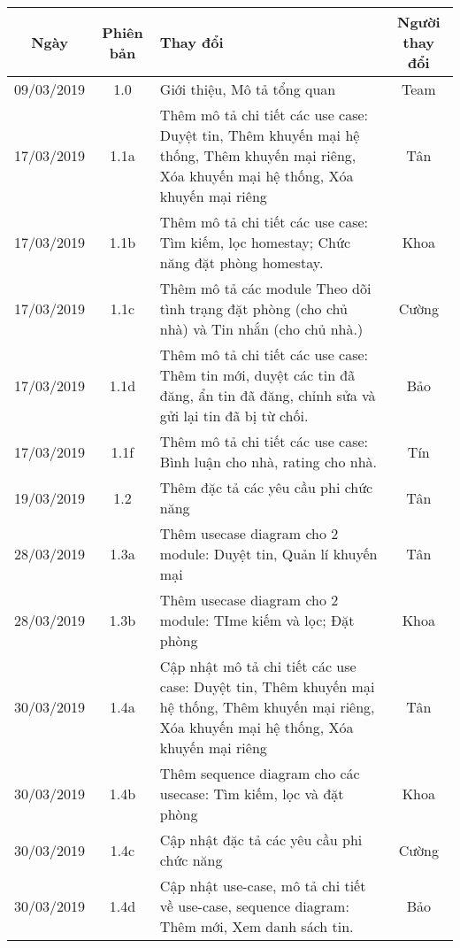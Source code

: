 \begin{center}
		\begin{longtable}{ | c | c | p{5cm} |c|}
		\hline 
		\textbf{Ngày} & \textbf{Phiên bản} & \textbf{Thay đổi} & \textbf{Người thay đổi} \\ \hline 
		09/03/2019 & 1.0 & Giới thiệu, Mô tả tổng quan & Team \\ \hline 
		17/03/2019 & 1.1a & Thêm mô tả chi tiết các use case: Duyệt tin, Thêm khuyến mại hệ thống, Thêm khuyến mại riêng, Xóa khuyến mại hệ thống, Xóa khuyến mại riêng & Tân \\ \hline  
		
		17/03/2019 & 1.1b & Thêm mô tả chi tiết các use case: Tìm kiếm, lọc homestay; Chức năng đặt phòng homestay. & Khoa\\ \hline
		
		17/03/2019 & 1.1c & Thêm mô tả các module Theo dõi tình trạng đặt phòng (cho chủ nhà) và Tin nhắn (cho chủ nhà.) & Cường \\ \hline
		
		17/03/2019 & 1.1d & Thêm mô tả chi tiết các use case: Thêm tin mới, duyệt các tin đã đăng, ẩn tin đã đăng, chỉnh  sửa và gửi lại tin đã bị từ chối. & Bảo \\ \hline  
		
		17/03/2019 & 1.1f & Thêm mô tả chi tiết các use case: Bình luận cho nhà, rating cho nhà. & Tín \\ \hline
		
		19/03/2019 & 1.2 & Thêm đặc tả các yêu cầu phi chức năng & Tân \\ \hline 
		28/03/2019 & 1.3a &  Thêm usecase diagram cho 2 module: Duyệt tin, Quản lí khuyến mại & Tân \\ \hline 
		28/03/2019 & 1.3b &  Thêm usecase diagram cho 2 module: TIme kiếm và lọc; Đặt phòng & Khoa \\ \hline 
		30/03/2019 & 1.4a & Cập nhật mô tả chi tiết các use case: Duyệt tin, Thêm khuyến mại hệ thống, Thêm khuyến mại riêng, Xóa khuyến mại hệ thống, Xóa khuyến mại riêng & Tân \\ \hline 
		30/03/2019 & 1.4b & Thêm sequence diagram cho các usecase: Tìm kiếm, lọc và đặt phòng & Khoa \\ \hline 
		30/03/2019 & 1.4c & Cập nhật đặc tả các yêu cầu phi chức năng & Cường \\ \hline
		30/03/2019 & 1.4d & Cập nhật use-case, mô tả chi tiết về use-case, sequence diagram: Thêm mới, Xem danh sách tin. & Bảo \\ \hline
		

\end{longtable}
\end{center}
